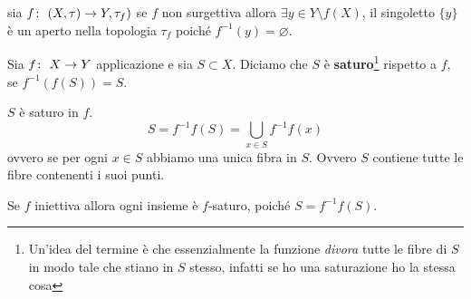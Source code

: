 \begin{remark}
	sia $f \colon\ (X, \tau) \rightarrow Y, \tau_f)$ se $f$ non surgettiva allora $\exists y \in Y \setminus f(X)$, il singoletto $\{y\}$ è un aperto nella topologia $\tau_f$ poiché $f^{-1}(y) = \varnothing$.
\end{remark} 

\begin{definition}
	Sia $f \colon\ X \rightarrow Y$ applicazione e sia $S \subset X$. Diciamo che $S$ è \textbf{saturo}\footnote{Un'idea del termine è che essenzialmente la funzione \textit{divora} tutte le fibre di $S$ in modo tale che stiano in $S$ stesso, infatti se ho una saturazione ho la stessa cosa} rispetto a $f$, se $f^{-1}(f(S)) = S$.
\end{definition} 

\begin{remark}
	$S$ è saturo in $f$.
	\begin{equation}
	S = f^{-1}f(S) = \bigcup_{x \in S} f^{-1}f(x)
	\end{equation}
	ovvero se per ogni $x \in S$ abbiamo una unica fibra in $S$. Ovvero $S$ contiene tutte le fibre contenenti i suoi punti. 
\end{remark} 

\begin{remark}
	Se $f$ iniettiva allora ogni insieme è $f$-saturo, poiché $S = f^{-1}f(S)$.
\end{remark}

